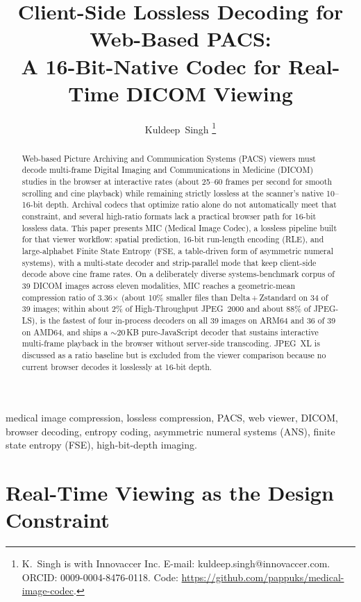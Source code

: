 \documentclass[journal]{IEEEtran}
\title{Client-Side Lossless Decoding for Web-Based PACS:\\
       A 16-Bit-Native Codec for Real-Time DICOM Viewing}
\author{Kuldeep~Singh%
\thanks{K.\ Singh is with Innovaccer Inc.
E-mail: kuldeep.singh@innovaccer.com.
ORCID: 0009-0004-8476-0118.
Code: \url{https://github.com/pappuks/medical-image-codec}.}%
}
\begin{document}
\maketitle

\begin{abstract}
Web-based Picture Archiving and Communication Systems (PACS) viewers must
decode multi-frame Digital Imaging and Communications in Medicine (DICOM)
studies in the browser at interactive rates (about 25--60 frames per second for
smooth scrolling and cine playback) while remaining strictly lossless at the
scanner's native 10--16-bit depth. Archival codecs that optimize ratio alone do
not automatically meet that constraint, and several high-ratio formats lack a
practical browser path for 16-bit lossless data. This paper presents MIC
(Medical Image Codec), a lossless pipeline built for that viewer workflow:
spatial prediction, 16-bit run-length encoding (RLE), and large-alphabet Finite
State Entropy (FSE, a table-driven form of asymmetric numeral systems), with a
multi-state decoder and strip-parallel mode that keep client-side decode above
cine frame rates. On a deliberately diverse systems-benchmark corpus of 39
DICOM images across eleven modalities, MIC reaches a geometric-mean compression
ratio of 3.36$\times$ (about 10\% smaller files than Delta\,+\,Zstandard on 34 of
39 images; within about 2\% of High-Throughput JPEG~2000 and about 88\% of
JPEG-LS), is the fastest of four in-process decoders on all 39 images on ARM64
and 36 of 39 on AMD64, and ships a ${\sim}$20\,KB pure-JavaScript decoder that
sustains interactive multi-frame playback in the browser without server-side
transcoding. JPEG~XL is discussed as a ratio baseline but is excluded from the
viewer comparison because no current browser decodes it losslessly at 16-bit
depth.
\end{abstract}

\begin{IEEEkeywords}
medical image compression, lossless compression, PACS, web viewer, DICOM,
browser decoding, entropy coding, asymmetric numeral systems (ANS), finite
state entropy (FSE), high-bit-depth imaging.
\end{IEEEkeywords}

\section{Real-Time Viewing as the Design Constraint}
\label{sec:intro}
\end{document}
